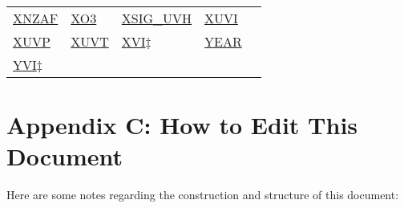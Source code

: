 \documentclass[
  english,
]{book}
\begin{document}
\begin{longtable}[]{@{}lllll@{}}
\href{/rmd_output/1/6-air-chemistry-measurements.html\#no-noy}{XNZAF} & \href{/rmd_output/1/6-air-chemistry-measurements.html\#f03-acd}{XO3} & \href{/rmd_output/1/4-the-state-of-the-atmosphere.html\#uvh-voltage}{XSIG\_UVH} & \href{/rmd_output/1/10-obsolete-variables.html\#xuvi}{XUVI} & \\
\href{/rmd_output/1/10-obsolete-variables.html\#xuvi}{XUVP} & \href{/rmd_output/1/10-obsolete-variables.html\#xuvi}{XUVT} & \href{/rmd_output/1/10-obsolete-variables.html\#ltn51}{XVI\(\ddagger\)} & \href{/rmd_output/1/2-general-information-about-data-files.html\#mdy}{YEAR} & \\
\href{/rmd_output/1/10-obsolete-variables.html\#ltn51}{YVI\(\ddagger\)} & & & & \\
\bottomrule
\end{longtable}

\hypertarget{appendix-c-how-to-edit-this-document}{%
\chapter*{Appendix C: How to Edit This Document}\label{appendix-c-how-to-edit-this-document}}

Here are some notes regarding the construction and structure of this document:
\end{document}
